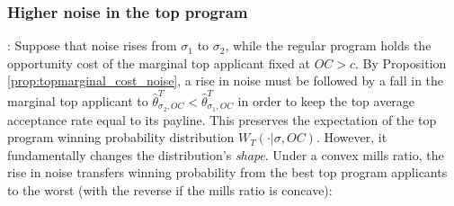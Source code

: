 \documentclass[12pt,reqno]{amsart}
\theoremstyle{definition}
\theoremstyle{plain} %
\begin{document}
\subsubsection{Higher noise in the top program}: Suppose that noise rises from $\sigma_1$ to $\sigma_2$, while the regular program holds the opportunity cost of the marginal top applicant fixed at $OC>c$. By Proposition \ref{prop:topmarginal_cost_noise}, a rise in noise must be followed by a fall in the marginal top applicant to $\hat{\theta}^T_{\sigma_2,OC}<\hat{\theta}^T_{\sigma_1,OC}$ in order to keep the top average acceptance rate equal to its payline. This preserves the expectation of the top program winning probability distribution $W_T(\cdot|\sigma,OC)$. However, it fundamentally changes the distribution's \textit{shape}. Under a convex mills ratio, the rise in noise transfers winning probability from the best top program applicants to the worst (with the reverse if the mills ratio is concave):


\end{document}
